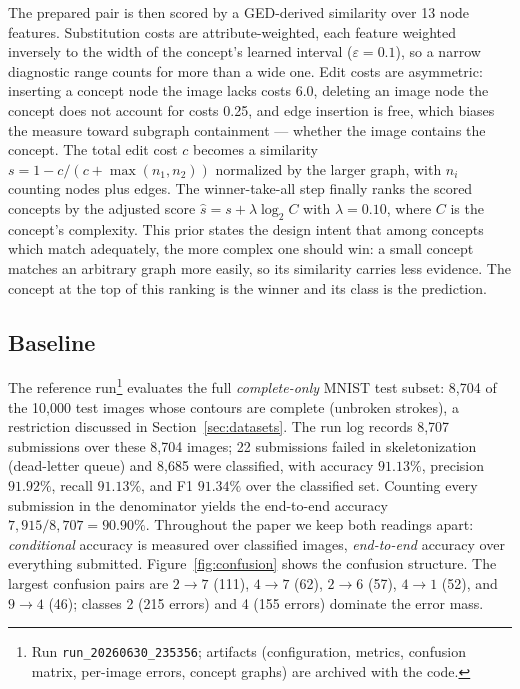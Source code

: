 \documentclass[conference]{IEEEtran}
\begin{document}
The prepared pair is then scored by a GED-derived similarity over 13 node
features. Substitution costs are attribute-weighted, each feature weighted
inversely to the width of the concept's learned interval
($\varepsilon = 0.1$), so a narrow diagnostic range counts for more than a
wide one. Edit costs are asymmetric: inserting a concept node the image
lacks costs 6.0, deleting an image node the concept does not account for
costs 0.25, and edge insertion is free, which biases the measure toward
subgraph containment --- whether the image contains the concept. The total
edit cost $c$ becomes a similarity $s = 1 - c/(c + \max(n_1, n_2))$
normalized by the larger graph, with $n_i$ counting nodes plus edges. The
winner-take-all step finally ranks the scored concepts by the adjusted score
$\hat{s} = s + \lambda \log_2 C$ with $\lambda = 0.10$, where $C$ is the
concept's complexity. This prior states the design intent that among
concepts which match adequately, the more complex one should win: a small
concept matches an arbitrary graph more easily, so its similarity carries
less evidence. The concept at the top of this ranking is the winner and its
class is the prediction.

\subsection{Baseline}
\label{sec:baseline}

The reference run\footnote{Run \texttt{run\_20260630\_235356}; artifacts
(configuration, metrics, confusion matrix, per-image errors, concept
graphs) are archived with the code.} evaluates the full \emph{complete-only}
MNIST test subset: 8{,}704 of the 10{,}000 test images whose contours are
complete (unbroken strokes), a restriction discussed in
Section~\ref{sec:datasets}. The run log records 8{,}707 submissions over
these 8{,}704 images; 22 submissions failed in
skeletonization (dead-letter queue) and 8{,}685 were classified, with
accuracy $91.13\%$, precision $91.92\%$, recall $91.13\%$, and F1
$91.34\%$ over the classified set. Counting every submission in the
denominator yields the end-to-end accuracy $7{,}915/8{,}707 = 90.90\%$.
Throughout the paper we keep both readings apart: \emph{conditional}
accuracy is measured over classified images, \emph{end-to-end} accuracy
over everything submitted.
Figure~\ref{fig:confusion} shows the confusion structure. The largest
confusion pairs are $2{\to}7$ (111), $4{\to}7$ (62), $2{\to}6$ (57),
$4{\to}1$ (52), and $9{\to}4$ (46); classes 2 (215 errors) and 4 (155
errors) dominate the error mass.
\end{document}
